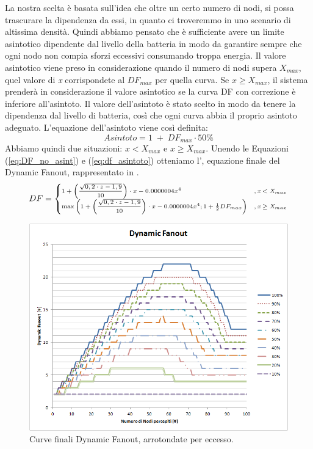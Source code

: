 La nostra scelta è basata sull'idea che oltre un certo numero di nodi, si possa trascurare la dipendenza da essi, in quanto ci troveremmo in uno scenario di altissima densità. Quindi abbiamo pensato che è sufficiente avere un limite asintotico dipendente dal livello della batteria in modo da garantire sempre che ogni nodo non compia sforzi eccessivi consumando troppa energia. Il valore asintotico viene preso in considerazione quando il numero di nodi supera $\mathit{X_{max}}$, quel valore di \textit{x} corrispondete al $\mathit{DF_{max}}$ per quella curva. Se $\textit{x}\geq\mathit{X_{max}}$, il sistema prenderà in considerazione il valore asintotico se la curva \acs{DF} con correzione è inferiore all'asintoto.
Il valore dell'asintoto è stato scelto in modo da tenere la dipendenza dal livello di batteria, così che ogni curva abbia il proprio asintoto adeguato. L'equazione dell'asintoto viene così definita:
\begin{equation}
	\label{eq:df_asintoto}
	Asintoto = 1\;+\;DF_{max}\cdot 50\%
\end{equation}
Abbiamo quindi due situazioni: $\textit{x}<\mathit{X_{max}}$ e $\textit{x}\geq \mathit{X_{max}}$. Unendo le Equazioni (\ref{eq:DF_no_asint}) e (\ref{eq:df_asintoto}) otteniamo l', equazione finale del Dynamic Fanout, rappresentato in .
\begin{equation}
\scriptsize
\label{eq:DF_totale}
DF = \begin{cases} 1 + \left( \dfrac{\sqrt{0,2\cdot z - 1,9}}{10} \right) \cdot x- 0.0000004x^4 & ,\textit{x}<\textit{X}_{max}\\
					\max \left( 1 + \left( \dfrac{\sqrt{0,2\cdot z - 1,9}}{10} \right) \cdot x- 0.0000004x^4 ; 1 + \frac{1}{2}DF_{max} \right) & ,\textit{x}\geq\textit{X}_{max}\end{cases}
\normalsize
\end{equation}
\begin{figure}[t]
	\centering
	\includegraphics[width=0.9\linewidth]{Images/grafici_usati/DF_tot_arr}
	\caption[DF finale (arrotondato)]{Curve finali Dynamic Fanout, arrotondate per eccesso.}
	\label{fig:DF_tot_arr}
\end{figure}
